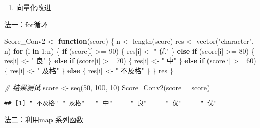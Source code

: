 \documentclass[
]{book}
\newenvironment{Shaded}{\begin{snugshade}}{\end{snugshade}}
\newcommand{\AttributeTok}[1]{\textcolor[rgb]{0.77,0.63,0.00}{#1}}
\newcommand{\CommentTok}[1]{\textcolor[rgb]{0.56,0.35,0.01}{\textit{#1}}}
\newcommand{\ControlFlowTok}[1]{\textcolor[rgb]{0.13,0.29,0.53}{\textbf{#1}}}
\newcommand{\DecValTok}[1]{\textcolor[rgb]{0.00,0.00,0.81}{#1}}
\newcommand{\FunctionTok}[1]{\textcolor[rgb]{0.00,0.00,0.00}{#1}}
\newcommand{\NormalTok}[1]{#1}
\newcommand{\OtherTok}[1]{\textcolor[rgb]{0.56,0.35,0.01}{#1}}
\newcommand{\SpecialCharTok}[1]{\textcolor[rgb]{0.00,0.00,0.00}{#1}}
\newcommand{\StringTok}[1]{\textcolor[rgb]{0.31,0.60,0.02}{#1}}
\providecommand{\tightlist}{%
  \setlength{\itemsep}{0pt}\setlength{\parskip}{0pt}}
\begin{document}
\begin{enumerate}
\def\labelenumi{\arabic{enumi}.}
\setcounter{enumi}{2}
\tightlist
\item
  向量化改进
\end{enumerate}

法一：for循环

\begin{Shaded}
\begin{Highlighting}[]
\NormalTok{Score\_Conv2 }\OtherTok{\textless{}{-}} \ControlFlowTok{function}\NormalTok{(score) \{}
\NormalTok{  n }\OtherTok{\textless{}{-}} \FunctionTok{length}\NormalTok{(score)}
\NormalTok{  res }\OtherTok{\textless{}{-}} \FunctionTok{vector}\NormalTok{(}\StringTok{"character"}\NormalTok{, n)}
  \ControlFlowTok{for}\NormalTok{ (i }\ControlFlowTok{in} \DecValTok{1}\SpecialCharTok{:}\NormalTok{n) \{}
    \ControlFlowTok{if}\NormalTok{ (score[i] }\SpecialCharTok{\textgreater{}=} \DecValTok{90}\NormalTok{) \{}
\NormalTok{      res[i] }\OtherTok{\textless{}{-}} \StringTok{" 优"}
\NormalTok{    \} }\ControlFlowTok{else} \ControlFlowTok{if}\NormalTok{ (score[i] }\SpecialCharTok{\textgreater{}=} \DecValTok{80}\NormalTok{) \{}
\NormalTok{      res[i] }\OtherTok{\textless{}{-}} \StringTok{" 良"}
\NormalTok{    \} }\ControlFlowTok{else} \ControlFlowTok{if}\NormalTok{ (score[i] }\SpecialCharTok{\textgreater{}=} \DecValTok{70}\NormalTok{) \{}
\NormalTok{      res[i] }\OtherTok{\textless{}{-}} \StringTok{" 中"}
\NormalTok{    \} }\ControlFlowTok{else} \ControlFlowTok{if}\NormalTok{ (score[i] }\SpecialCharTok{\textgreater{}=} \DecValTok{60}\NormalTok{) \{}
\NormalTok{      res[i] }\OtherTok{\textless{}{-}} \StringTok{" 及格"}
\NormalTok{    \} }\ControlFlowTok{else}\NormalTok{ \{}
\NormalTok{      res[i] }\OtherTok{\textless{}{-}} \StringTok{" 不及格"}
\NormalTok{    \}}
\NormalTok{  \}}
\NormalTok{  res}
\NormalTok{\}}

\CommentTok{\# 结果测试}
\NormalTok{score }\OtherTok{\textless{}{-}} \FunctionTok{seq}\NormalTok{(}\DecValTok{50}\NormalTok{, }\DecValTok{100}\NormalTok{, }\DecValTok{10}\NormalTok{)}
\FunctionTok{Score\_Conv2}\NormalTok{(}\AttributeTok{score =}\NormalTok{ score)}
\end{Highlighting}
\end{Shaded}

\begin{verbatim}
## [1] " 不及格" " 及格"   " 中"     " 良"     " 优"     " 优"
\end{verbatim}

法二：利用map 系列函数
\end{document}
